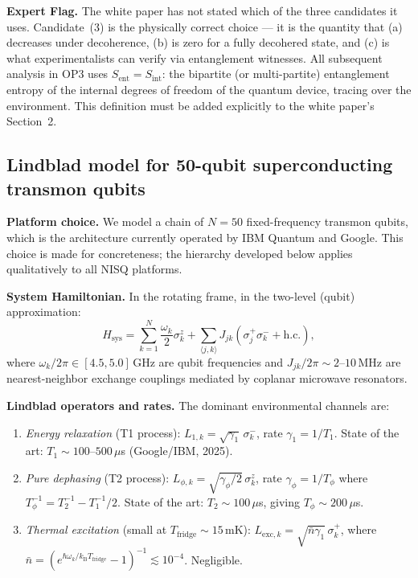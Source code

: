 \documentclass[12pt,letterpaper]{article}
\theoremstyle{plain}
\theoremstyle{definition}
\theoremstyle{remark}
\newenvironment{expertflag}{%
  \begin{mdframed}[backgroundcolor=boxgray,linecolor=flagred,linewidth=1.2pt]
  \noindent\textcolor{flagred}{\textbf{Expert Flag.}}\quad}{%
  \end{mdframed}}
\newcommand{\kB}{k_{\mathrm{B}}}
\newcommand{\Sent}{S_{\mathrm{ent}}}
\begin{document}
\begin{expertflag}
The white paper has not stated which of the three candidates it uses.  Candidate~(3) is
the physically correct choice --- it is the quantity that (a) decreases under decoherence,
(b) is zero for a fully decohered state, and (c) is what experimentalists can
verify via entanglement witnesses.  All subsequent analysis in OP3 uses $\Sent = S_{\mathrm{int}}$:
the bipartite (or multi-partite) entanglement entropy of the internal degrees of freedom of
the quantum device, tracing over the environment.  This definition must be added explicitly
to the white paper's Section~2.
\end{expertflag}

\subsection{Lindblad model for 50-qubit superconducting transmon qubits}

\textbf{Platform choice.}  We model a chain of $N = 50$ fixed-frequency transmon qubits,
which is the architecture currently operated by IBM Quantum and Google.  This choice is made
for concreteness; the hierarchy developed below applies qualitatively to all NISQ platforms.

\textbf{System Hamiltonian.}  In the rotating frame, in the two-level (qubit) approximation:
\begin{equation}
  H_{\mathrm{sys}}
  = \sum_{k=1}^{N}\frac{\omega_k}{2}\sigma^z_k
  + \sum_{\langle j,k\rangle}J_{jk}\left(\sigma^+_j\sigma^-_k + \mathrm{h.c.}\right),
  \label{eq:H-transmon}
\end{equation}
where $\omega_k/2\pi \in [4.5, 5.0]$\,GHz are qubit frequencies and
$J_{jk}/2\pi \sim 2$--$10$\,MHz are nearest-neighbor exchange couplings mediated by
coplanar microwave resonators.

\textbf{Lindblad operators and rates.}  The dominant environmental channels are:

\begin{enumerate}[label=(\roman*)]
  \item \textit{Energy relaxation} (T1 process):
    $L_{1,k} = \sqrt{\gamma_1}\,\sigma^-_k$, rate $\gamma_1 = 1/T_1$.
    State of the art: $T_1 \sim 100$--$500\,\mu$s (Google/IBM, 2025).

  \item \textit{Pure dephasing} (T2 process):
    $L_{\phi,k} = \sqrt{\gamma_\phi/2}\,\sigma^z_k$, rate $\gamma_\phi = 1/T_\phi$
    where $T_\phi^{-1} = T_2^{-1} - T_1^{-1}/2$.
    State of the art: $T_2 \sim 100\,\mu$s, giving $T_\phi \sim 200\,\mu$s.

  \item \textit{Thermal excitation} (small at $T_{\mathrm{fridge}} \sim 15$\,mK):
    $L_{\mathrm{exc},k} = \sqrt{\bar{n}\gamma_1}\,\sigma^+_k$,
    where $\bar{n} = (e^{\hbar\omega_k/\kB T_{\mathrm{fridge}}}-1)^{-1} \lesssim 10^{-4}$.
    Negligible.
\end{enumerate}
\end{document}
